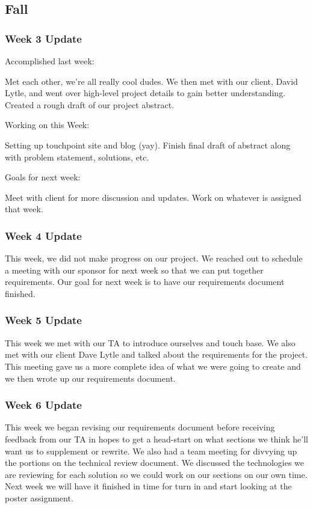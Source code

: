 

\subsection{Fall}

\subsubsection{Week 3 Update}
Accomplished last week:​

Met each other, we're all really cool dudes.
We then met with our client, David Lytle, and went over high-level project details to gain better understanding.
Created a rough draft of our project abstract.

Working on this Week:

Setting up touchpoint site and blog (yay).
​Finish final draft of abstract along with problem statement, solutions, etc. 

Goals for next week:

Meet with client for more discussion and updates.
Work on whatever is assigned that week.


\subsubsection{Week 4 Update}
This week, we did not make progress on our project. 
We reached out to schedule a meeting with our sponsor for next week so that we can put together requirements. 
Our goal for next week is to have our requirements document finished.

\subsubsection{Week 5 Update}
This week we met with our TA to introduce ourselves and touch base. 
We also met with our client Dave Lytle and talked about the requirements for the project. 
This meeting gave us a more complete idea of what we were going to create and we then wrote up our requirements document. 

\subsubsection{Week 6 Update}
This week we began revising our requirements document before receiving feedback from our TA in hopes to get a head-start on what sections we think he'll want us to supplement or rewrite. 
We also had a team meeting for divvying up the portions on the technical review document. 
We discussed the technologies we are reviewing for each solution so we could work on our sections on our own time. 
Next week we will have it finished in time for turn in and start looking at the poster assignment. 



